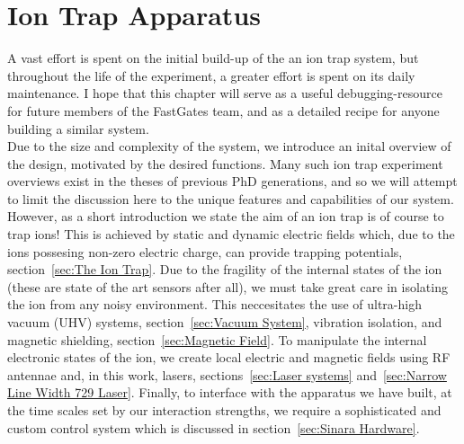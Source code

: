 \chapter{Ion Trap Apparatus}
\minitoc

    A vast effort is spent on the initial build-up of the an ion trap system, but
    throughout the life of the experiment, a greater effort is spent on its daily
    maintenance.  I hope that this chapter will serve as a useful debugging-resource for future
    members of the FastGates team, and as a detailed recipe for anyone
    building a similar system. \\

    Due to the size and complexity of the system, we introduce an inital overview of
    the design, motivated by the desired functions.  
    Many such  ion trap experiment overviews exist in the theses of previous PhD generations, and so we will attempt to limit the discussion here to the unique features and capabilities of our system.\\
    
    However, as a short introduction we state the aim of an ion trap is of course to trap ions! This is achieved by
    static and dynamic electric fields which, due to the ions possesing non-zero
    electric charge, can provide trapping potentials, section~\ref{sec:The Ion
    Trap}. Due to the fragility of the internal states of the ion (these are state
    of the art sensors after all), we must take great care in isolating the ion from
    any noisy environment. This neccesitates the use of ultra-high vacuum (UHV)
    systems, section~\ref{sec:Vacuum System}, vibration isolation, and magnetic
    shielding, section~\ref{sec:Magnetic Field}. To manipulate the internal electronic states of the ion, we create
    local electric and magnetic fields using RF antennae and, in this work, lasers,
    sections~\ref{sec:Laser systems} and~\ref{sec:Narrow Line Width 729 Laser}.
    Finally, to interface with the apparatus we have built, at the time scales set by our interaction strengths, we require a sophisticated and custom control system which is discussed in section~\ref{sec:Sinara Hardware}.




